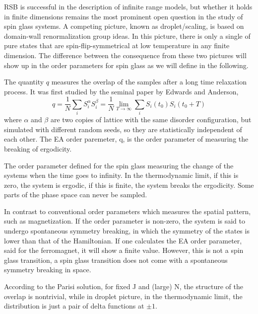 RSB is successful in the description of infinite range models, but whether it 
holds in finite dimensions remains the most prominent open question in the study of spin glass systems. 
A competing picture, known as droplet/scaling, is based on domain-wall 
renormalization group ideas. In this picture, there is only a single of
pure states that are spin-flip-symmetrical at low temperature in any finite 
dimension. The difference between the consequence from these two pictures 
will show up in the order parameters for spin glass as we will define in the following.


The quantity $q$ measures the overlap of the samples after a long time relaxation process. 
It was first studied by the seminal paper by Edwards and Anderson,
\begin{equation}
  \label{eq:q}
  q=\frac{1}{N}\sum_iS_i^\alpha S_i^\beta=\frac{1}{N}\lim_{T\to \infty}\sum_iS_i(t_0)S_i(t_0+T)
\end{equation}
where $\alpha$ and $\beta$ are two copies of lattice with the same disorder 
configuration, but simulated with different random seeds, so they are
statistically independent of each other. The EA order paremeter, q, 
is the order parameter of measuring the breaking of ergodicity. 

The order parameter defined for the spin glass measuring the change of the systems
when the time goes to infinity. In the thermodynamic limit, if this
is zero, the system is ergodic, if this is finite, the system breaks
the ergodicity. Some parts of the phase space can never be sampled.

In contrast to conventional order parameters which measures the 
spatial pattern, such as magnetization. If the order parameter is non-zero, 
the system is said to undergo spontaneous symmetry breaking, in which the symmetry of 
the states is lower than that of the Hamiltonian. If one calculates
the EA order parameter, said for the ferromagnet, it will
show a finite value. However, this is not a spin glass transition, a
spin glass transition does not come with a spontaneous symmetry breaking in space.

According to the Parisi solution, for fixed J and (large) N, the structure of 
the overlap is nontrivial, while in droplet picture, in the thermodynamic limit, 
the distribution is just a pair of delta functions at $\pm 1$. 

